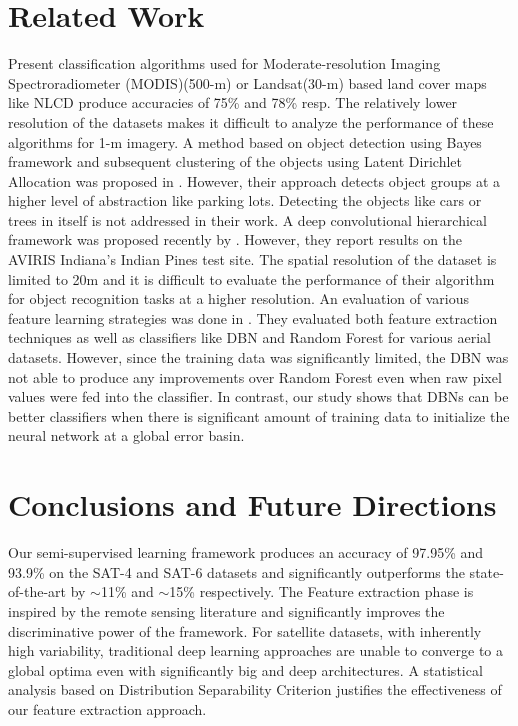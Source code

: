 \documentclass[11pt,a4paper]{article}
\begin{document}
\section{Related Work}
Present classification algorithms used for Moderate-resolution Imaging Spectroradiometer (MODIS)(500-m) \cite{Friedl_MCD_Coll5Validation2009} or Landsat(30-m) based land cover maps like NLCD \cite{wickham2013} produce accuracies of 75\% and 78\% resp. The relatively lower resolution of the datasets makes it difficult to analyze the performance of these algorithms for 1-m imagery. A method based on object detection using Bayes framework and subsequent clustering of the objects using Latent Dirichlet Allocation was proposed in \cite{Vaduva2012}. However, their approach detects object groups at a higher level of abstraction like parking lots. Detecting the objects like cars or trees in itself is not addressed in their work. A deep convolutional hierarchical framework was proposed recently by \cite{romerounsupervised}. However, they report results on the AVIRIS Indiana's Indian Pines test site. The spatial resolution of the dataset is limited to 20m and it is difficult to evaluate the performance of their algorithm for object recognition tasks at a higher resolution. An evaluation of various feature learning strategies was done in \cite{Tokarczyk2012}. They evaluated both feature extraction techniques as well as classifiers like DBN and Random Forest for various aerial datasets. However, since the training data was significantly limited, the DBN was not able to produce any improvements over Random Forest even when raw pixel values were fed into the classifier. In contrast, our study shows that DBNs can be better classifiers when there is significant amount of training data to initialize the neural network at a global error basin.  



\section{Conclusions and Future Directions}

Our semi-supervised learning framework produces an accuracy of 97.95\% and 93.9\% on the SAT-4 and SAT-6 datasets and significantly outperforms the state-of-the-art by ${\sim}$11\% and ${\sim}$15\% respectively. The Feature extraction phase is inspired by the remote sensing literature and significantly improves the discriminative power of the framework. For satellite datasets, with inherently high variability, traditional deep learning approaches are unable to converge to a global optima even with significantly big and deep architectures. A statistical analysis based on Distribution Separability Criterion justifies the effectiveness of our feature extraction approach.    
\end{document}
